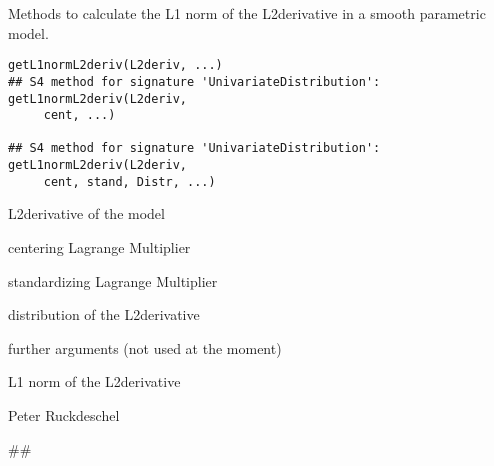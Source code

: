 \begin{Description}\relax
Methods to calculate the L1 norm of the L2derivative in a smooth parametric model.
\end{Description}
\begin{Usage}
\begin{verbatim}getL1normL2deriv(L2deriv, ...)
## S4 method for signature 'UnivariateDistribution':
getL1normL2deriv(L2deriv, 
     cent, ...)

## S4 method for signature 'UnivariateDistribution':
getL1normL2deriv(L2deriv, 
     cent, stand, Distr, ...)

\end{verbatim}
\end{Usage}
\begin{Arguments}
\begin{ldescription}
\item[\code{L2deriv}] L2derivative of the model
\item[\code{cent}] centering Lagrange Multiplier
\item[\code{stand}] standardizing Lagrange Multiplier
\item[\code{Distr}] distribution of the L2derivative
\item[\code{...}] further arguments (not used at the moment)
\end{ldescription}
\end{Arguments}
\begin{Value}
L1 norm of the L2derivative
\end{Value}
\begin{Author}\relax
Peter Ruckdeschel 
\end{Author}
\begin{Examples}
\begin{ExampleCode}
##
\end{ExampleCode}
\end{Examples}


